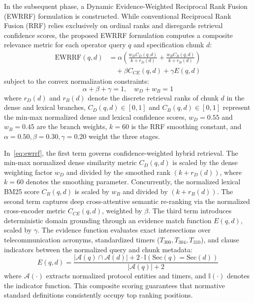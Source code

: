 \documentclass[conference]{IEEEtran}
\begin{document}
In the subsequent phase, a Dynamic Evidence-Weighted Reciprocal Rank Fusion (EWRRF) formulation is constructed. While conventional Reciprocal Rank Fusion (RRF) relies exclusively on ordinal ranks and disregards retrieval confidence scores, the proposed EWRRF formulation computes a composite relevance metric for each operator query $q$ and specification chunk $d$:
\begin{equation}
\begin{aligned}
\text{EWRRF}(q, d) &= \alpha \left( \frac{w_D C_D(q, d)}{k + r_D(d)} + \frac{w_B C_B(q, d)}{k + r_B(d)} \right) \\
&\quad + \beta C_{CE}(q, d) + \gamma E(q, d)
\end{aligned}
\label{eq:ewrrf}
\end{equation}
subject to the convex normalization constraints:
\begin{equation}
\alpha + \beta + \gamma = 1, \quad w_D + w_B = 1
\label{eq:constraints}
\end{equation}
where $r_D(d)$ and $r_B(d)$ denote the discrete retrieval ranks of chunk $d$ in the dense and lexical branches, $C_D(q,d) \in [0,1]$ and $C_B(q,d) \in [0,1]$ represent the min-max normalized dense and lexical confidence scores, $w_D = 0.55$ and $w_B = 0.45$ are the branch weights, $k = 60$ is the RRF smoothing constant, and $\alpha = 0.50, \beta = 0.30, \gamma = 0.20$ weight the three stages.

In~\eqref{eq:ewrrf}, the first term governs confidence-weighted hybrid retrieval. The min-max normalized dense similarity metric $C_D(q, d)$ is scaled by the dense weighting factor $w_D$ and divided by the smoothed rank $(k + r_D(d))$, where $k = 60$ denotes the smoothing parameter. Concurrently, the normalized lexical BM25 score $C_B(q, d)$ is scaled by $w_B$ and divided by $(k + r_B(d))$. The second term captures deep cross-attentive semantic re-ranking via the normalized cross-encoder metric $C_{CE}(q, d)$, weighted by $\beta$. The third term introduces deterministic domain grounding through an evidence match function $E(q, d)$, scaled by $\gamma$. The evidence function evaluates exact intersections over telecommunication acronyms, standardized timers ($T_{300}, T_{304}, T_{310}$), and clause indicators between the normalized query and chunk metadata:
\begin{equation}
E(q, d) = \frac{|\mathcal{A}(q) \cap \mathcal{A}(d)| + 2 \cdot \mathbb{I}(\text{Sec}(q) = \text{Sec}(d))}{|\mathcal{A}(q)| + 2}
\label{eq:evidence}
\end{equation}
where $\mathcal{A}(\cdot)$ extracts normalized protocol entities and timers, and $\mathbb{I}(\cdot)$ denotes the indicator function. This composite scoring guarantees that normative standard definitions consistently occupy top ranking positions.
\end{document}
